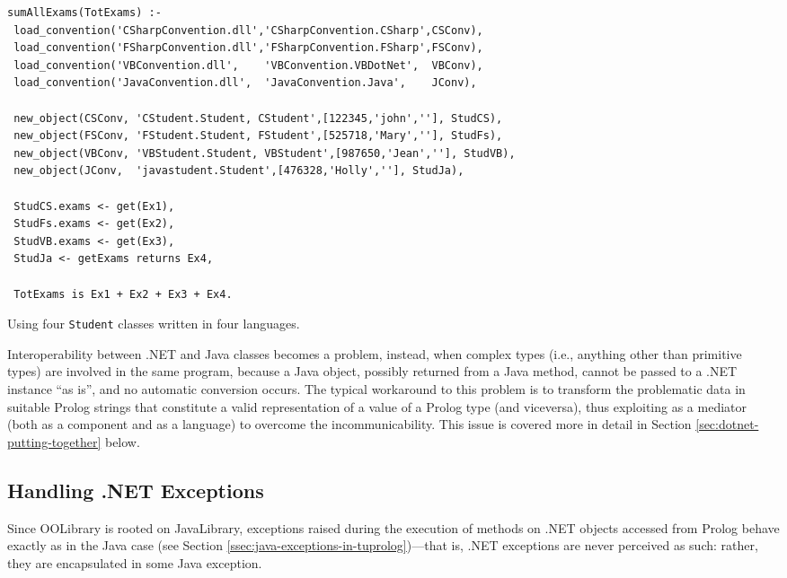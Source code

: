 \begin{table}
{\footnotesize
\begin{verbatim}
sumAllExams(TotExams) :-
 load_convention('CSharpConvention.dll','CSharpConvention.CSharp',CSConv),
 load_convention('FSharpConvention.dll','FSharpConvention.FSharp',FSConv),
 load_convention('VBConvention.dll',    'VBConvention.VBDotNet',  VBConv),
 load_convention('JavaConvention.dll',  'JavaConvention.Java',    JConv),

 new_object(CSConv, 'CStudent.Student, CStudent',[122345,'john',''], StudCS),
 new_object(FSConv, 'FStudent.Student, FStudent',[525718,'Mary',''], StudFs),
 new_object(VBConv, 'VBStudent.Student, VBStudent',[987650,'Jean',''], StudVB),
 new_object(JConv,  'javastudent.Student',[476328,'Holly',''], StudJa),

 StudCS.exams <- get(Ex1),
 StudFs.exams <- get(Ex2),
 StudVB.exams <- get(Ex3),
 StudJa <- getExams returns Ex4,

 TotExams is Ex1 + Ex2 + Ex3 + Ex4.
\end{verbatim}
}
  \caption{Using four \texttt{Student} classes written in four languages.}
  \label{tab:dotnet-oolibrary-examples3}
\end{table}

Interoperability between .NET and Java classes becomes a problem, instead, when complex types (i.e., anything other than primitive types) are involved in the same \tuprolog{} program, because a Java object, possibly returned from a Java method, cannot be passed to a .NET instance ``as is'', and no automatic conversion occurs.
%
The typical workaround to this problem is to transform the problematic data in suitable Prolog strings that constitute a valid \tuprolog{} representation of a value of a Prolog type (and viceversa), thus exploiting \tuprolog{} as a mediator (both as a component and as a language) to overcome the incommunicability.
%
This issue is covered more in detail in Section \ref{sec:dotnet-putting-together} below.

\subsection{Handling .NET Exceptions}
\label{ssec:dotnet-oolibrary-exceptions}

Since OOLibrary is rooted on JavaLibrary, exceptions raised during the execution of methods on .NET objects accessed from Prolog behave exactly as in the Java case (see Section \ref{ssec:java-exceptions-in-tuprolog})---that is, .NET exceptions are never perceived as such: rather, they are encapsulated in some Java exception.

